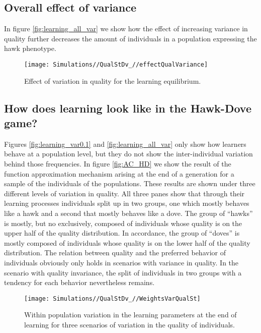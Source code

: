 \documentclass[]{article}
\begin{document}
\hypertarget{overall-effect-of-variance}{%
\subsection{Overall effect of
variance}\label{overall-effect-of-variance}}

In figure \ref{fig:learning_all_var} we show how the effect of
increasing variance in quality further decreases the amount of
individuals in a population expressing the hawk phenotype.

\begin{figure}
\texttt{[image: Simulations//QualStDv\_//effectQualVariance]} \caption{\label{fig:learning_all_var}Effect of variation in quality for the learning equilibrium.}\label{fig:fig5}
\end{figure}

\hypertarget{how-does-learning-look-like-in-the-hawk-dove-game}{%
\subsection{How does learning look like in the Hawk-Dove
game?}\label{how-does-learning-look-like-in-the-hawk-dove-game}}

Figures \ref{fig:learning_var0.1} and \ref{fig:learning_all_var} only
show how learners behave at a population level, but they do not show the
inter-individual variation behind those frequencies. In figure
\ref{fig:AC_HD} we show the result of the function approximation
mechanism arising at the end of a generation for a sample of the
individuals of the populations. These results are shown under three
different levels of variation in quality. All three panes show that
through their learning processes individuals split up in two groups, one
which mostly behaves like a hawk and a second that mostly behaves like a
dove. The group of ``hawks'' is mostly, but no exclusively, composed of
individuals whose quality is on the upper half of the quality
distribution. In accordance, the group of ``doves'' is mostly composed
of individuals whose quality is on the lower half of the quality
distribution. The relation between quality and the preferred behavior of
individuals obviously only holds in scenarios with variance in quality.
In the scenario with quality invariance, the split of individuals in two
groups with a tendency for each behavior nevertheless remains.

\begin{figure}
\texttt{[image: Simulations//QualStDv\_//WeightsVarQualSt]} \caption{\label{fig:AC_HD}Within population variation in the learning parameters at the end of learning for three scenarios of variation in the quality of individuals.}\label{fig:fig6}
\end{figure}
\end{document}
